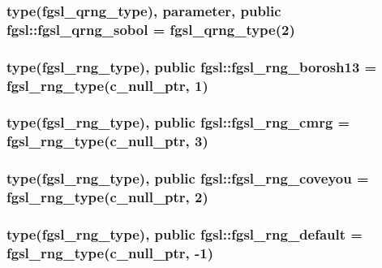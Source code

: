 \subsubsection[{fgsl\+\_\+qrng\+\_\+sobol}]{\setlength{\rightskip}{0pt plus 5cm}type({\bf fgsl\+\_\+qrng\+\_\+type}), parameter, public fgsl\+::fgsl\+\_\+qrng\+\_\+sobol = {\bf fgsl\+\_\+qrng\+\_\+type}(2)}\label{namespacefgsl_ae1c1dcc2273c7307b2f972c9f04ab69f}
\hypertarget{namespacefgsl_afcf3a859944205f1a11e0dc35e13e608}{}
\subsubsection[{fgsl\+\_\+rng\+\_\+borosh13}]{\setlength{\rightskip}{0pt plus 5cm}type({\bf fgsl\+\_\+rng\+\_\+type}), public fgsl\+::fgsl\+\_\+rng\+\_\+borosh13 = {\bf fgsl\+\_\+rng\+\_\+type}(c\+\_\+null\+\_\+ptr, 1)}\label{namespacefgsl_afcf3a859944205f1a11e0dc35e13e608}
\hypertarget{namespacefgsl_a46ec4ab895207c6e3da1a2adb29bb0ff}{}
\subsubsection[{fgsl\+\_\+rng\+\_\+cmrg}]{\setlength{\rightskip}{0pt plus 5cm}type({\bf fgsl\+\_\+rng\+\_\+type}), public fgsl\+::fgsl\+\_\+rng\+\_\+cmrg = {\bf fgsl\+\_\+rng\+\_\+type}(c\+\_\+null\+\_\+ptr, 3)}\label{namespacefgsl_a46ec4ab895207c6e3da1a2adb29bb0ff}
\hypertarget{namespacefgsl_a8eb316ba1f0e42680fb05bf4444f3018}{}
\subsubsection[{fgsl\+\_\+rng\+\_\+coveyou}]{\setlength{\rightskip}{0pt plus 5cm}type({\bf fgsl\+\_\+rng\+\_\+type}), public fgsl\+::fgsl\+\_\+rng\+\_\+coveyou = {\bf fgsl\+\_\+rng\+\_\+type}(c\+\_\+null\+\_\+ptr, 2)}\label{namespacefgsl_a8eb316ba1f0e42680fb05bf4444f3018}
\hypertarget{namespacefgsl_ab8c31f8079ad3a768a528cd525c8ccf2}{}
\subsubsection[{fgsl\+\_\+rng\+\_\+default}]{\setlength{\rightskip}{0pt plus 5cm}type({\bf fgsl\+\_\+rng\+\_\+type}), public fgsl\+::fgsl\+\_\+rng\+\_\+default = {\bf fgsl\+\_\+rng\+\_\+type}(c\+\_\+null\+\_\+ptr, -\/1)}\label{namespacefgsl_ab8c31f8079ad3a768a528cd525c8ccf2}
\hypertarget{namespacefgsl_a26af265921be65d7d401bd4865dfe221}{}
